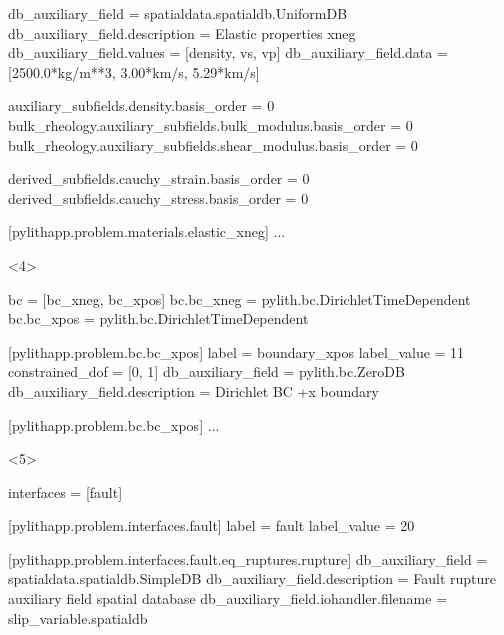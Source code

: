 \documentclass{beamer}
\begin{document}
\begin{frame}[t,fragile]
\begin{minipage}[t]{0.60\textwidth}
\begin{onlyenv}
\begin{cfgcode}
        db_auxiliary_field = spatialdata.spatialdb.UniformDB
        db_auxiliary_field.description = Elastic properties xneg
        db_auxiliary_field.values = [density, vs, vp]
        db_auxiliary_field.data = [2500.0*kg/m**3, 3.00*km/s, 5.29*km/s]

        auxiliary_subfields.density.basis_order = 0
        bulk_rheology.auxiliary_subfields.bulk_modulus.basis_order = 0
        bulk_rheology.auxiliary_subfields.shear_modulus.basis_order = 0

        derived_subfields.cauchy_strain.basis_order = 0
        derived_subfields.cauchy_stress.basis_order = 0

        [pylithapp.problem.materials.elastic_xneg]
        ...
      \end{cfgcode}
    \end{onlyenv}
    \begin{onlyenv}<4>
      \begin{cfgcode}
        bc = [bc_xneg, bc_xpos]
        bc.bc_xneg = pylith.bc.DirichletTimeDependent
        bc.bc_xpos = pylith.bc.DirichletTimeDependent
        
        [pylithapp.problem.bc.bc_xpos]
        label = boundary_xpos
        label_value = 11
        constrained_dof = [0, 1]
        db_auxiliary_field = pylith.bc.ZeroDB
        db_auxiliary_field.description = Dirichlet BC +x boundary

        [pylithapp.problem.bc.bc_xpos]
        ...
      \end{cfgcode}
    \end{onlyenv}
    \begin{onlyenv}<5>
      \begin{cfgcode}
        interfaces = [fault]

        [pylithapp.problem.interfaces.fault]
        label = fault
        label_value = 20

        [pylithapp.problem.interfaces.fault.eq_ruptures.rupture]
        db_auxiliary_field = spatialdata.spatialdb.SimpleDB
        db_auxiliary_field.description = Fault rupture auxiliary field spatial database
        db_auxiliary_field.iohandler.filename = slip_variable.spatialdb
      \end{cfgcode}
    \end{onlyenv}
  \end{minipage}

  
\end{frame}
\end{document}
